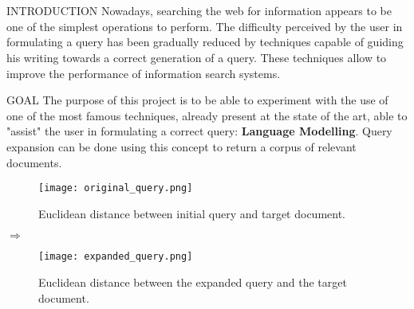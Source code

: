 \section{}

\begin{frame}{INTRODUCTION}
    Nowadays, searching the web for information appears to be one of the 
    simplest operations to perform. The difficulty perceived by the user in 
    formulating a query has been gradually reduced by techniques capable of 
    guiding his writing towards a correct generation of a query. These 
    techniques allow to improve the performance of information search 
    systems.
\end{frame}

\begin{frame}{GOAL}
    The purpose of this project is to be able to experiment with the use of 
    one of the most famous techniques, already present at the state of the 
    art, able to "assist" the user in formulating a correct query: {\bfseries Language 
    Modelling}. Query expansion can be done using this concept to return a 
    corpus of relevant documents. 
    \begin{minipage}{\linewidth}
        \centering
        \begin{minipage}{0.45\linewidth}
            \begin{figure}[h!]
                \centering
                \texttt{[image: original\_query.png]}
                \centering
                \caption{Euclidean distance between initial query and target document.}
            \end{figure}
        \end{minipage}
        $\Rightarrow$
        \begin{minipage}{0.45\linewidth}
            \begin{figure}[h!]
                \centering
                \texttt{[image: expanded\_query.png]}
                \centering
                \caption{Euclidean distance between the expanded query and the target document.}
            \end{figure}
        \end{minipage}
    \end{minipage}
\end{frame}


